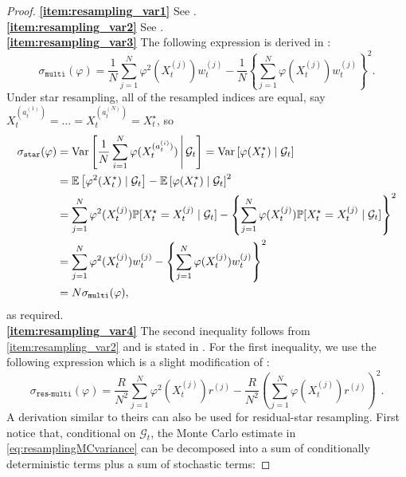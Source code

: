 \begin{proof}
\textbf{\ref{item:resampling_var1}} See \textcite[Section 3]{douc2005}.\\
\textbf{\ref{item:resampling_var2}} See \textcite[Section 3]{douc2005}.\\
\textbf{\ref{item:resampling_var3}}
The following expression is derived in \textcite[Equation (6)]{douc2005}:
\begin{equation*}
\sigma_{\texttt{multi}}(\varphi)
= \frac{1}{N} \sum_{j=1}^N \varphi^2(X_t^{(j)}) w_t^{(j)}
        - \frac{1}{N} \left\{ \sum_{j=1}^N \varphi(X_t^{(j)}) w_t^{(j)} \right\}^2 .
\end{equation*}
Under star resampling, all of the resampled indices are equal, say $X_t^{(a_t^{(1)})} = \dots = X_t^{(a_t^{(N)})} = X_t^\star$, so
\begin{align}
\sigma_{\texttt{star}}(\varphi)
&= \operatorname{Var}\left[ \frac{1}{N} \sum_{i=1}^N \varphi( X_t^{(a_t^{(i)})} ) \,\middle|\, \mathcal{G}_t \right]
= \operatorname{Var}\left[ \varphi( X_t^\star) \mid \mathcal{G}_t \right] \notag\\
&= \mathbb{E}\left[ \varphi^2( X_t^\star) \mid \mathcal{G}_t \right]
        - \mathbb{E}\left[ \varphi( X_t^\star) \mid \mathcal{G}_t \right]^2 \notag\\
&= \sum_{j=1}^N \varphi^2(X_t^{(j)}) 
        \mathbb{P}[ X_t^\star = X_t^{(j)} \mid \mathcal{G}_t ]
        - \left\{ \sum_{j=1}^N \varphi(X_t^{(j)}) 
        \mathbb{P}[ X_t^\star = X_t^{(j)} \mid \mathcal{G}_t ] \right\}^2 \notag\\
&= \sum_{j=1}^N \varphi^2(X_t^{(j)}) w_t^{(j)}
        - \left\{ \sum_{j=1}^N \varphi(X_t^{(j)}) w_t^{(j)} \right\}^2 \label{eq:condvar_star}\\
&= N \sigma_{\texttt{multi}}(\varphi) , \notag
\end{align}
as required.\\
\textbf{\ref{item:resampling_var4}} The second inequality follows from \ref{item:resampling_var2} and is stated in \textcite[p.9]{gerber2017}.
For the first inequality, we use the following expression which is a slight modification of \textcite[Equation (8)]{douc2005}:
\begin{equation*}
\sigma_{\texttt{res-multi}}(\varphi)
= \frac{R}{N^2} \sum_{j=1}^N \varphi^2(X_t^{(j)}) r^{(j)}
        - \frac{R}{N^2} \left( \sum_{j=1}^N \varphi(X_t^{(j)}) r^{(j)} \right)^2 .
\end{equation*}
A derivation similar to theirs can also be used for residual-star resampling. 
First notice that, conditional on $\mathcal{G}_t$, the Monte Carlo estimate in \eqref{eq:resamplingMCvariance} can be decomposed into a sum of conditionally deterministic terms plus a sum of stochastic terms:

\end{proof}
